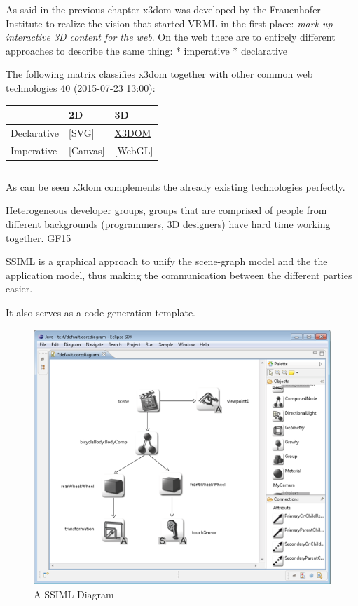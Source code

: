 As said in the previous chapter x3dom was developed by the Frauenhofer
Institute to realize the vision that started VRML in the first place:
\emph{mark up interactive 3D content for the web}. On the web there are
to entirely different approaches to describe the same thing: *
imperative * declarative

The following matrix classifies x3dom together with other common web
technologies \href{http://www.x3dom.org}{40} (2015-07-23 13:00):

\begin{longtable}[c]{@{}lll@{}}
\toprule
& 2D & 3D\tabularnewline
\midrule
\endhead
Declarative & {[}SVG{]} & \hyperref[x3dom]{X3DOM}\tabularnewline
Imperative & {[}Canvas{]} & {[}WebGL{]}\tabularnewline
\bottomrule
\end{longtable}

\begin{table}[htbp]
  \centering
  \begin{tabularx}{\textwidth}{X X}
    \hline

  \end{tabularx}
\end{table}

As can be seen x3dom complements the already existing technologies
perfectly.


Heterogeneous developer groups, groups that are comprised of people from
different backgrounds (programmers, 3D designers) have hard time working
together. \href{http://dx.doi.org/10.1007/s00450-014-0256-x}{GF15}

SSIML is a graphical approach to unify the scene-graph model and the the
application model, thus making the communication between the different
parties easier.

It also serves as a code generation template.

\begin{figure}[htbp]
  \centering
  \includegraphics[width=12cm]{../assets/SSIML.png}
	\caption{A SSIML Diagram \cite{roundtrip3dwebsite}}
	\label{fig:ssimldiagram}
\end{figure}

